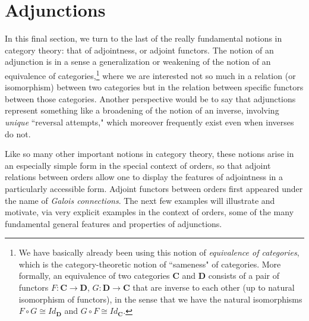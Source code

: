 \documentclass[11pt]{book}
\theoremstyle{definition}
\theoremstyle{definition}
\theoremstyle{definition}
\theoremstyle{theorem}
\theoremstyle{definition}
\begin{document}
\section{Adjunctions}
In this final section, we turn to the last of the really fundamental notions in category theory: that of adjointness, or adjoint functors.  The notion of an adjunction is in a sense a generalization or weakening of the notion of an equivalence of categories,\footnote{We have basically already been using this notion of \textit{equivalence of categories}, which is the category-theoretic notion of ``sameness" of categories. More formally, an equivalence of two categories $\textbf{C}$ and $\textbf{D}$ consists of a pair of functors $F: \textbf{C} \rightarrow \textbf{D}$, $G: \textbf{D} \rightarrow \textbf{C}$ that are inverse to each other (up to natural isomorphism of functors), in the sense that we have the natural isomorphisms $F \circ G \cong Id_{\textbf{D}}$ and $G \circ F \cong Id_{\textbf{C}}$.} where we are interested not so much in a relation (or isomorphism) between two categories but in the relation between specific functors between those categories. Another perspective would be to say that adjunctions represent something like a broadening of the notion of an inverse, involving \textit{unique} ``reversal attempts," which moreover frequently exist even when inverses do not.  \par 
Like so many other important notions in category theory, these notions arise in an especially simple form in the special context of orders, so that adjoint relations between orders allow one to display the features of adjointness in a particularly accessible form. Adjoint functors between orders first appeared under the name of \textit{Galois connections}. The next few examples will illustrate and motivate, via very explicit examples in the context of orders, some of the many fundamental general features and properties of adjunctions. 
\end{document}
